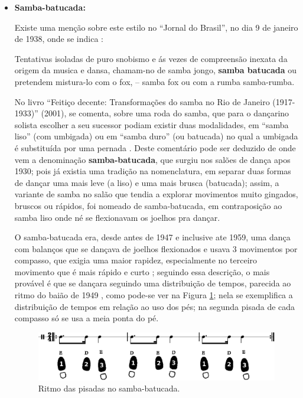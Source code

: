 \begin{itemize}
\item \textbf{Samba-batucada:}



Existe uma menção sobre este estilo no ``Jornal do Brasil'', no dia 9 de janeiro de 1938,
onde se indica \cite[pp. 4]{musicasambavariasdef1}:
\begin{citando}%
Tentativas isoladas de puro 
snobismo e ás vezes de compreensão 
inexata da origem da 
musica e dansa, chamam-no de samba jongo, \textbf{samba batucada} ou
pretendem mistura-lo com o fox, -- samba fox ou com a rumba samba-rumba.
\end{citando}



No livro ``Feitiço decente: Transformações do samba no Rio de Janeiro (1917-1933)'' (2001),
se comenta, sobre uma roda do samba, que para o dançarino solista  escolher a seu sucessor podiam
existir duas modalidades, em ``samba liso'' (com umbigada) ou em ``samba duro'' 
(ou batucada) no qual a umbigada é substituída por uma pernada \cite[pp. 109]{sandroni2001feitico}.
Deste comentário pode ser deduzido de onde vem a denominação \textbf{samba-batucada}, 
que surgiu nos salões de dança apos 1930; pois já existia uma tradição na nomenclatura,
em separar duas formas de dançar uma mais leve (a liso) e uma mais brusca (batucada);
assim, a variante de samba no salão que tendia a explorar movimentos muito  gingados, bruscos ou rápidos,
foi nomeado de samba-batucada, em contraposição ao samba liso onde né se flexionavam os joelhos pra dançar.  



O samba-batucada era, desde antes de 1947 e inclusive ate 1959, uma dança com balanços que se dançava de joelhos flexionados  
e usava 3 movimentos por compasso, que exigia uma maior rapidez, 
especialmente no terceiro movimento que é mais rápido e curto \cite[pp. 61]{fornaciari1947aprender} \cite[pp. 58,66]{freitas1959danca};
seguindo essa descrição, 
o mais provável é que se dançara seguindo uma distribuição de tempos,
parecida ao ritmo do baião de 1949 \cite{CORTES2014}, como pode-se ver na Figura \ref{time:sambabatucada};
nela se exemplifica a distribuição de tempos em relação ao uso dos pés;
na segunda pisada de cada compasso só se usa a meia ponta do pé.
\begin{figure}[H]
\centering
\includegraphics[width=\textwidth]{chapters/cap-historia-sambagafieira/sambabatucada.eps}
\caption{Ritmo das pisadas no samba-batucada.}
\label{time:sambabatucada}
\end{figure}


\end{itemize}
